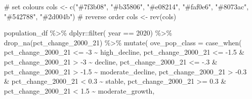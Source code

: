 \documentclass[
  letterpaper,
  DIV=11,
  numbers=noendperiod]{scrreprt}
\newenvironment{Shaded}{\begin{snugshade}}{\end{snugshade}}
\newcommand{\AttributeTok}[1]{\textcolor[rgb]{0.40,0.45,0.13}{#1}}
\newcommand{\CommentTok}[1]{\textcolor[rgb]{0.37,0.37,0.37}{#1}}
\newcommand{\DecValTok}[1]{\textcolor[rgb]{0.68,0.00,0.00}{#1}}
\newcommand{\FloatTok}[1]{\textcolor[rgb]{0.68,0.00,0.00}{#1}}
\newcommand{\FunctionTok}[1]{\textcolor[rgb]{0.28,0.35,0.67}{#1}}
\newcommand{\NormalTok}[1]{\textcolor[rgb]{0.00,0.23,0.31}{#1}}
\newcommand{\OtherTok}[1]{\textcolor[rgb]{0.00,0.23,0.31}{#1}}
\newcommand{\SpecialCharTok}[1]{\textcolor[rgb]{0.37,0.37,0.37}{#1}}
\newcommand{\StringTok}[1]{\textcolor[rgb]{0.13,0.47,0.30}{#1}}
\begin{document}
\begin{Shaded}
\begin{Highlighting}[]
\CommentTok{\# set colours}
\NormalTok{cols }\OtherTok{\textless{}{-}} \FunctionTok{c}\NormalTok{(}\StringTok{"\#7f3b08"}\NormalTok{, }\StringTok{"\#b35806"}\NormalTok{, }\StringTok{"\#e08214"}\NormalTok{, }\StringTok{"\#faf0e6"}\NormalTok{, }\StringTok{"\#8073ac"}\NormalTok{, }\StringTok{"\#542788"}\NormalTok{, }\StringTok{"\#2d004b"}\NormalTok{)}
\CommentTok{\# reverse order}
\NormalTok{cols }\OtherTok{\textless{}{-}} \FunctionTok{rev}\NormalTok{(cols)}

\NormalTok{population\_df }\SpecialCharTok{\%\textgreater{}\%}\NormalTok{ dplyr}\SpecialCharTok{::}\FunctionTok{filter}\NormalTok{( year }\SpecialCharTok{==} \DecValTok{2020}\NormalTok{) }\SpecialCharTok{\%\textgreater{}\%}
  \FunctionTok{drop\_na}\NormalTok{(pct\_change\_2000\_21) }\SpecialCharTok{\%\textgreater{}\%} 
    \FunctionTok{mutate}\NormalTok{(}
    \AttributeTok{ove\_pop\_class =} \FunctionTok{case\_when}\NormalTok{( pct\_change\_2000\_21 }\SpecialCharTok{\textless{}=} \SpecialCharTok{{-}}\DecValTok{3} \SpecialCharTok{\textasciitilde{}} \StringTok{\textquotesingle{}high\_decline\textquotesingle{}}\NormalTok{,}
\NormalTok{                           pct\_change\_2000\_21 }\SpecialCharTok{\textless{}=} \SpecialCharTok{{-}}\FloatTok{1.5} \SpecialCharTok{\&}\NormalTok{ pct\_change\_2000\_21 }\SpecialCharTok{\textgreater{}} \SpecialCharTok{{-}}\DecValTok{3} \SpecialCharTok{\textasciitilde{}} \StringTok{\textquotesingle{}decline\textquotesingle{}}\NormalTok{,}
\NormalTok{                           pct\_change\_2000\_21 }\SpecialCharTok{\textless{}=} \SpecialCharTok{{-}}\NormalTok{.}\DecValTok{3} \SpecialCharTok{\&}\NormalTok{ pct\_change\_2000\_21 }\SpecialCharTok{\textgreater{}} \SpecialCharTok{{-}}\FloatTok{1.5} \SpecialCharTok{\textasciitilde{}} \StringTok{\textquotesingle{}moderate\_decline\textquotesingle{}}\NormalTok{,}
\NormalTok{                           pct\_change\_2000\_21 }\SpecialCharTok{\textgreater{}} \SpecialCharTok{{-}}\FloatTok{0.3} \SpecialCharTok{\&}\NormalTok{ pct\_change\_2000\_21 }\SpecialCharTok{\textless{}} \FloatTok{0.3} \SpecialCharTok{\textasciitilde{}} \StringTok{\textquotesingle{}stable\textquotesingle{}}\NormalTok{,}
\NormalTok{                           pct\_change\_2000\_21 }\SpecialCharTok{\textgreater{}=} \FloatTok{0.3} \SpecialCharTok{\&}\NormalTok{ pct\_change\_2000\_21 }\SpecialCharTok{\textless{}} \FloatTok{1.5} \SpecialCharTok{\textasciitilde{}} \StringTok{\textquotesingle{}moderate\_growth\textquotesingle{}}\NormalTok{,}

\end{Highlighting}
\end{Shaded}
\end{document}
